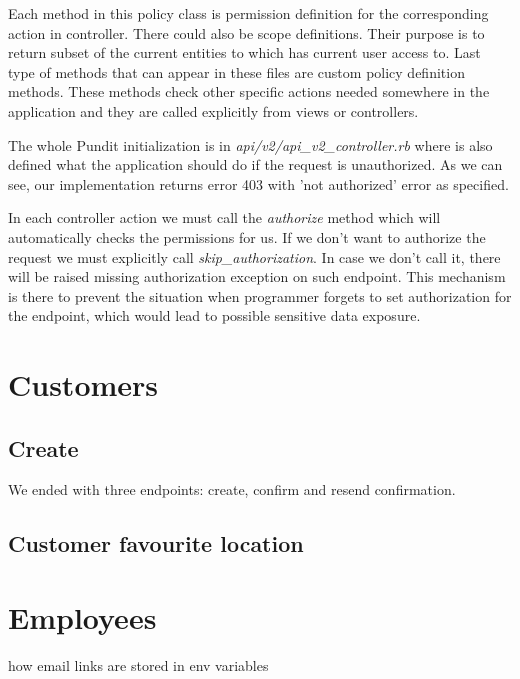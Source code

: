Each method in this policy class is permission definition for the corresponding action in controller. There could also be scope definitions. Their purpose is to return subset of the current entities to which has current user access to. Last type of methods that can appear in these files are custom policy definition methods. These methods check other specific actions needed somewhere in the application and they are called explicitly from views or controllers.

The whole Pundit initialization is in \textit{api/v2/api\_v2\_controller.rb} where is also defined what the application should do if the request is unauthorized. As we can see, our implementation returns error 403 with 'not authorized' error as specified.

In each controller action we must call the \textit{authorize} method which will automatically checks the permissions for us. If we don't want to authorize the request we must explicitly call \textit{skip\_authorization}. In case we don't call it, there will be raised missing authorization exception on such endpoint. This mechanism is there to prevent the situation when programmer forgets to set authorization for the endpoint, which would lead to possible sensitive data exposure.

\section {Customers}
\subsection{Create}
We ended with three endpoints: create, confirm and resend confirmation. 

\subsection{Customer favourite location}

\section {Employees}
how email links are stored in env variables

